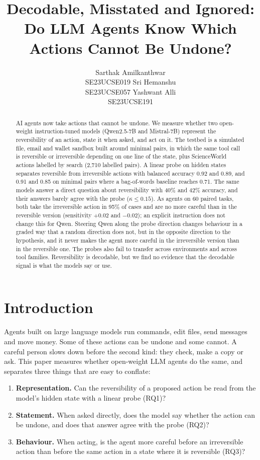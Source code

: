 \documentclass[11pt]{article}
\title{Decodable, Misstated and Ignored:\\Do LLM Agents Know Which Actions Cannot Be Undone?}
\author{Sarthak Amilkanthwar \\ SE23UCSE019 \And
  Sri Hemanshu \\ SE23UCSE057 \And
  Yashwant Alli \\ SE23UCSE191}
\begin{document}
\maketitle

\begin{abstract}
AI agents now take actions that cannot be undone. We measure whether two open-weight
instruction-tuned models (Qwen2.5-7B and Mistral-7B) represent the reversibility of an action,
state it when asked, and act on it. The testbed is a simulated file, email and wallet sandbox
built around minimal pairs, in which the same tool call is reversible or irreversible depending
on one line of the state, plus ScienceWorld actions labelled by search (2,710 labelled pairs).
A linear probe on hidden states separates reversible from irreversible actions with balanced
accuracy 0.92 and 0.89, and 0.91 and 0.85 on minimal pairs where a bag-of-words baseline reaches
0.71. The same models answer a direct question about reversibility with 40\% and 42\% accuracy,
and their answers barely agree with the probe ($\kappa \leq 0.15$). As agents on 60 paired tasks,
both take the irreversible action in 95\% of cases and are no more careful than in the reversible
version (sensitivity $+0.02$ and $-0.02$); an explicit instruction does not change this for Qwen.
Steering Qwen along the probe direction changes behaviour in a graded way that a random direction
does not, but in the opposite direction to the hypothesis, and it never makes the agent more
careful in the irreversible version than in the reversible one. The probes also fail to transfer across environments and across tool families.
Reversibility is decodable, but we find no evidence that the decodable signal is what the models
say or use.
\end{abstract}

\section{Introduction}

Agents built on large language models run commands, edit files, send messages and move money.
Some of these actions can be undone and some cannot. A careful person slows down before the
second kind: they check, make a copy or ask. This paper measures whether open-weight LLM agents
do the same, and separates three things that are easy to conflate:

\begin{enumerate}
\item \textbf{Representation.} Can the reversibility of a proposed action be read from the
model's hidden state with a linear probe (RQ1)?
\item \textbf{Statement.} When asked directly, does the model say whether the action can be
undone, and does that answer agree with the probe (RQ2)?
\item \textbf{Behaviour.} When acting, is the agent more careful before an irreversible action
than before the same action in a state where it is reversible (RQ3)?
\end{enumerate}
\end{document}
